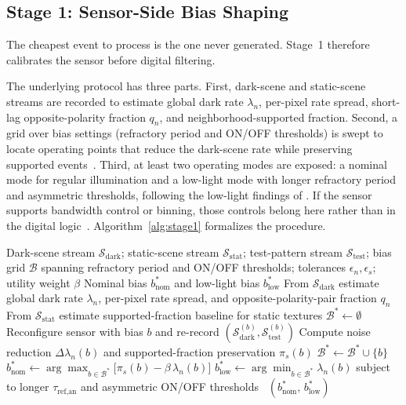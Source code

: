 \documentclass[a4paper,fleqn]{cas-dc}
\begin{document}
\subsection{Stage 1: Sensor-Side Bias Shaping}
\label{sec:bias}

The cheapest event to process is the one never generated. Stage~1 therefore calibrates the sensor before digital filtering.

The underlying protocol has three parts. First, dark-scene and static-scene streams are recorded to estimate global dark rate $\lambda_n$, per-pixel rate spread, short-lag opposite-polarity fraction $q_n$, and neighborhood-supported fraction. Second, a grid over bias settings (refractory period and ON/OFF thresholds) is swept to locate operating points that reduce the dark-scene rate while preserving supported events~\citep{delbruck2021feedback,mcreynolds2022experimental}. Third, at least two operating modes are exposed: a nominal mode for regular illumination and a low-light mode with longer refractory period and asymmetric thresholds, following the low-light findings of \citet{mcreynolds2023lowlight}. If the sensor supports bandwidth control or binning, those controls belong here rather than in the digital logic~\citep{graca2024scidvs,graca2023optimal}. Algorithm~\ref{alg:stage1} formalizes the procedure.

\begin{algorithm}[t]
\caption{Sensor-side bias calibration (Stage~1)}
\label{alg:stage1}
\begin{algorithmic}[1]
\REQUIRE Dark-scene stream $\mathcal{S}_{\text{dark}}$; static-scene stream $\mathcal{S}_{\text{stat}}$; test-pattern stream $\mathcal{S}_{\text{test}}$; bias grid $\mathcal{B}$ spanning refractory period and ON/OFF thresholds; tolerances $\epsilon_n, \epsilon_s$; utility weight $\beta$
\ENSURE Nominal bias $b^{*}_{\text{nom}}$ and low-light bias $b^{*}_{\text{low}}$
\STATE {}
\STATE From $\mathcal{S}_{\text{dark}}$ estimate global dark rate $\lambda_n$, per-pixel rate spread, and opposite-polarity-pair fraction $q_n$
\STATE From $\mathcal{S}_{\text{stat}}$ estimate supported-fraction baseline for static textures
\STATE $\mathcal{B}^{*} \gets \emptyset$
    \STATE Reconfigure sensor with bias $b$ and re-record $(\mathcal{S}_{\text{dark}}^{(b)}, \mathcal{S}_{\text{test}}^{(b)})$
    \STATE Compute noise reduction $\Delta\lambda_n(b)$ and supported-fraction preservation $\pi_s(b)$
        \STATE $\mathcal{B}^{*} \gets \mathcal{B}^{*} \cup \{b\}$
    \ENDIF
\ENDFOR
\STATE $b^{*}_{\text{nom}} \gets \arg\max_{b\in\mathcal{B}^{*}} \bigl[\pi_s(b) - \beta\,\lambda_n(b)\bigr]$
\STATE $b^{*}_{\text{low}} \gets \arg\min_{b\in\mathcal{B}^{*}} \lambda_n(b)$ subject to longer $\tau_{\text{ref,an}}$ and asymmetric ON/OFF thresholds~\citep{mcreynolds2023lowlight}
\RETURN $(b^{*}_{\text{nom}},\, b^{*}_{\text{low}})$
\end{algorithmic}
\end{algorithm}
\end{document}
